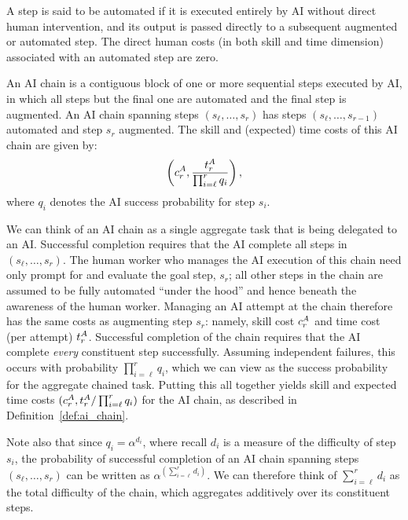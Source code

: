 \begin{definition}
\label{def:automated_task}
A step is said to be automated if it is executed entirely by AI without direct human intervention, and its output is passed directly to a subsequent augmented or automated step. 
The direct human costs (in both skill and time dimension) associated with an automated step are zero.
\end{definition}

\begin{definition}[AI Chain]
\label{def:ai_chain}
An AI chain is a contiguous block of one or more sequential steps executed by AI, in which all steps but the final one are automated and the final step is augmented.
An AI chain spanning steps $(s_\ell,\dots,s_r)$ has steps $(s_\ell,\dots,s_{r-1})$ automated and step $s_r$ augmented.
The skill and (expected) time costs of this AI chain are given by:
\[
\left(c^{A}_{r}, \frac{t^{A}_{r}}{\prod_{i=\ell}^{r} q_i}\right),
\]
where $q_i$ denotes the AI success probability for step $s_i$.
\end{definition}

We can think of an AI chain as a single aggregate task that is being delegated to an AI.
Successful completion requires that the AI complete all steps in $(s_\ell, \dotsc, s_r)$.
The human worker who manages the AI execution of this chain need only prompt for and evaluate the goal step, $s_r$; all other steps in the chain are assumed to be fully automated ``under the hood'' and hence beneath the awareness of the human worker.
Managing an AI attempt at the chain therefore has the same costs as augmenting step $s_r$: namely, skill cost $c^{A}_{r}$ and time cost (per attempt) $t^{A}_{r}$.
Successful completion of the chain requires that the AI complete \emph{every} constituent step successfully.
Assuming independent failures, this occurs with probability $\prod_{i=\ell}^r q_i$, which we can view as the success probability for the aggregate chained task.
Putting this all together yields skill and expected time costs $(c^{A}_{r}, t^{A}_{r} / \prod_{i=\ell}^{r} q_i)$ for the AI chain, as described in Definition~\ref{def:ai_chain}.

Note also that since $q_i = \alpha^{d_i}$, where recall $d_i$ is a measure of the difficulty of step $s_i$, the probability of successful completion of an AI chain spanning steps $(s_\ell, \dotsc, s_r)$ can be written as $\alpha^{(\sum_{i=\ell}^r d_i)}$.
We can therefore think of $\sum_{i=\ell}^r d_i$ as the total difficulty of the chain, which aggregates additively over its constituent steps.

